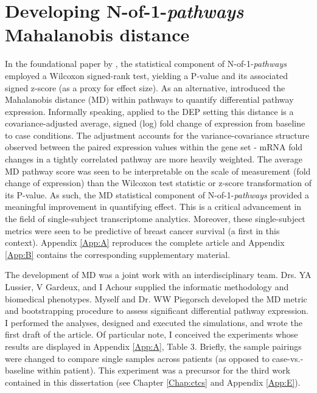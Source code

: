 \chapter{Developing N-of-1-\emph{pathways} \\Mahalanobis distance} \label{Chap:md}

\indent \indent In the foundational paper by \citet{Gardeux2014}, the statistical component of N-of-1-\emph{pathways} employed a Wilcoxon signed-rank test, yielding a P-value and its associated signed z-score (as a proxy for effect size). As an alternative, \citet{Schissler2015} introduced the Mahalanobis distance (MD) within pathways to quantify differential pathway expression. Informally speaking, applied to the DEP setting this distance is a covariance-adjusted average, signed (log) fold change of expression from baseline to case conditions. The adjustment accounts for the variance-covariance structure observed between the paired expression values within the gene set - mRNA fold changes in a tightly correlated pathway are more heavily weighted. The average MD pathway score was seen to be interpretable on the scale of measurement (fold change of expression) than the Wilcoxon test statistic or z-score transformation of its P-value. As such, the MD statistical component of N-of-1-\emph{pathways} provided a meaningful improvement in quantifying effect. This is a critical advancement in the field of single-subject transcriptome analytics. Moreover, these single-subject metrics were seen to be predictive of breast cancer survival (a first in this context). Appendix \ref{App:A} reproduces the complete \citet{Schissler2015} article and Appendix \ref{App:B} contains the corresponding supplementary material.

The development of MD was a joint work with an interdisciplinary team. Drs. YA Lussier, V Gardeux, and I Achour supplied the informatic methodology and biomedical phenotypes. Myself and Dr. WW Piegorsch developed the MD metric and bootstrapping procedure to assess significant differential pathway expression. I performed the analyses, designed and executed the simulations, and wrote the first draft of the article. Of particular note, I conceived the experiments whose results are displayed in Appendix \ref{App:A}, Table 3. Briefly, the sample pairings were changed to compare single samples across patients (as opposed to case-vs.-baseline within patient). This experiment was a precursor for the third work contained in this dissertation (see Chapter \ref{Chap:ctcs} and Appendix \ref{App:E}). 
